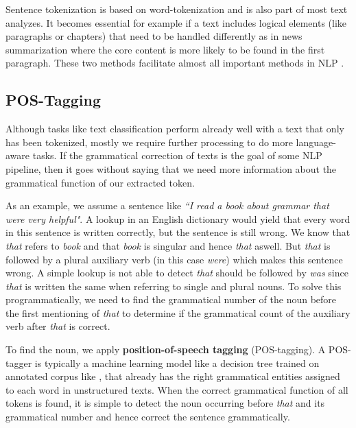 Sentence tokenization is based on word-tokenization and is also part of most text analyzes. It becomes essential for example if a text includes logical elements (like paragraphs or chapters) that need to be handled differently as in news summarization where the core content is more likely to be found in the first paragraph.
These two methods facilitate almost all important methods in NLP \citep{Webster1992}.

\subsection{POS-Tagging}
Although tasks like text classification perform already well with a text that only has been tokenized, mostly we require further processing to do more language-aware tasks.
If the grammatical correction of texts is the goal of some NLP pipeline, then it goes without saying that we need more information about the grammatical function of our extracted token.

As an example, we assume a sentence like \textit{``I read a book about grammar that were very helpful"}.
A lookup in an English dictionary would yield that every word in this sentence is written correctly, but the sentence is still wrong.
We know that \textit{that} refers to \textit{book} and that \textit{book} is singular and hence \textit{that} aswell. But \textit{that} is followed by a plural auxiliary verb (in this case \textit{were}) which makes this sentence wrong.
A simple lookup is not able to detect \textit{that} should be followed by \textit{was} since \textit{that} is written the same when referring to single and plural nouns.
To solve this programmatically, we need to find the grammatical number of the noun before the first mentioning of \textit{that} to determine if the grammatical count of the auxiliary verb after \textit{that} is correct.

To find the noun, we apply \textbf{position-of-speech tagging} (\gls{POS-tagging}). A POS-tagger is typically a machine learning model like a decision tree \citep{Marquez98} trained on annotated corpus like \citep{PennTreebank}, that already has the right grammatical entities assigned to each word in unstructured texts.
When the correct grammatical function of all tokens is found, it is simple to detect the noun occurring before  \textit{that}  and its grammatical number and hence correct the sentence grammatically.

